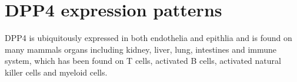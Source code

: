 \section{DPP4 expression patterns}
DPP4 is ubiquitously expressed in both endothelia and epithlia and is found on many mammals organs including kidney, liver, lung, intestines and immune system, which has been found on T cells, activated B cells, activated natural killer cells and myeloid cells.~\cite{Abbott1994,Shingu2003,Hong1989,Gutschmidt1981,Dikov2004,Bühling1995,Tanaka1992,Gorrell1991}